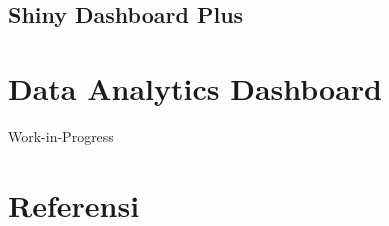 \documentclass[
]{book}
\begin{document}
\hypertarget{shiny-dashboard-plus-1}{%
\section{Shiny Dashboard Plus}\label{shiny-dashboard-plus-1}}

\hypertarget{data-analytics-dashboard}{%
\chapter{Data Analytics Dashboard}\label{data-analytics-dashboard}}

Work-in-Progress

\hypertarget{referensi}{%
\chapter{Referensi}\label{referensi}}

  
\end{document}
